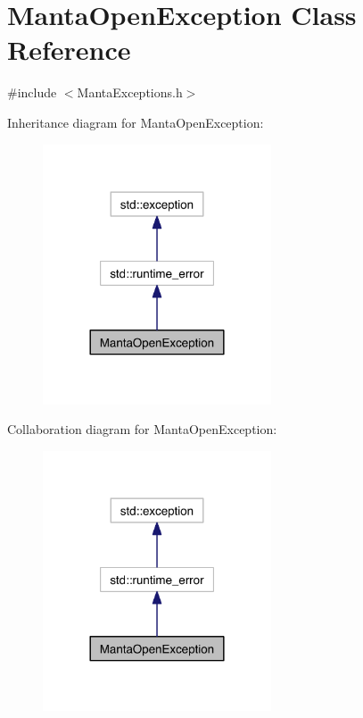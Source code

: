 \hypertarget{classMantaOpenException}{\section{\-Manta\-Open\-Exception \-Class \-Reference}
\label{classMantaOpenException}
}


{\ttfamily \#include $<$\-Manta\-Exceptions.\-h$>$}



\-Inheritance diagram for \-Manta\-Open\-Exception\-:\nopagebreak
\begin{figure}[H]
\begin{center}
\leavevmode
\includegraphics[width=192pt]{classMantaOpenException__inherit__graph}
\end{center}
\end{figure}


\-Collaboration diagram for \-Manta\-Open\-Exception\-:\nopagebreak
\begin{figure}[H]
\begin{center}
\leavevmode
\includegraphics[width=192pt]{classMantaOpenException__coll__graph}
\end{center}
\end{figure}
